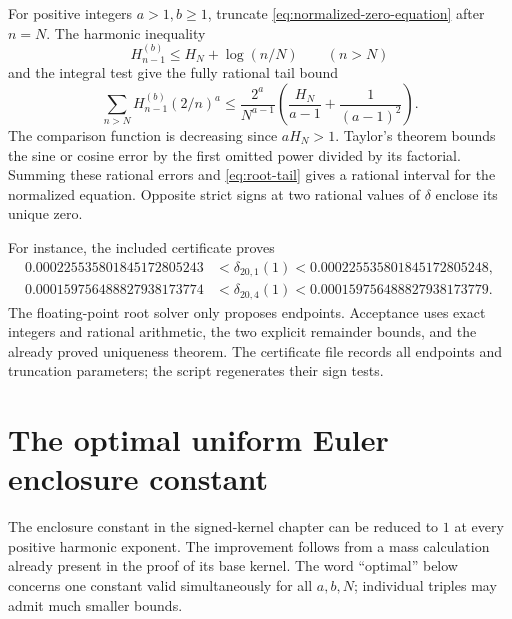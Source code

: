 \documentclass[11pt]{article}
\numberwithin{equation}{section}
\theoremstyle{plain}
\theoremstyle{definition}
\theoremstyle{remark}
\begin{document}
For positive integers $a>1,b\ge1$, truncate
\eqref{eq:normalized-zero-equation} after $n=N$. The harmonic inequality
\[
 H_{n-1}^{(b)}\le H_N+\log(n/N)\qquad(n>N)
\]
and the integral test give the fully rational tail bound
\begin{equation}\label{eq:root-tail}
 \sum_{n>N}H_{n-1}^{(b)}(2/n)^a
 \le \frac{2^a}{N^{a-1}}
       \left(\frac{H_N}{a-1}+\frac1{(a-1)^2}\right).
\end{equation}
The comparison function is decreasing since $aH_N>1$.
Taylor's theorem bounds the sine or cosine error by the first omitted
power divided by its factorial. Summing these rational errors and
\eqref{eq:root-tail} gives a rational interval for the normalized
equation. Opposite strict signs at two rational values of $\delta$
enclose its unique zero.

For instance, the included certificate proves
\begin{align*}
 0.000225535801845172805243
 &<\delta_{20,1}(1)
 <0.000225535801845172805248,\\
 0.000159756488827938173774
 &<\delta_{20,4}(1)
 <0.000159756488827938173779.
\end{align*}
The floating-point root solver only proposes endpoints. Acceptance
uses exact integers and rational arithmetic, the two explicit remainder
bounds, and the already proved uniqueness theorem. The certificate
file records all endpoints and truncation parameters; the script
regenerates their sign tests.

\section{The optimal uniform Euler enclosure constant}

The enclosure constant in the signed-kernel chapter can be reduced to $1$ at every
positive harmonic exponent. The improvement follows from a mass
calculation already present in the proof of its base kernel.
The word ``optimal'' below concerns one constant valid simultaneously
for all $a,b,N$; individual triples may admit much smaller bounds.
\end{document}
